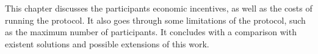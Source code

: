 \begin{mychapterabstract}
    This chapter discusses the participants economic incentives,
     as well as the costs of running the protocol. It also goes through some
     limitations of the protocol, such as the maximum number of participants.
     It concludes with a comparison with existent solutions and possible extensions
     of this work.
\end{mychapterabstract}
